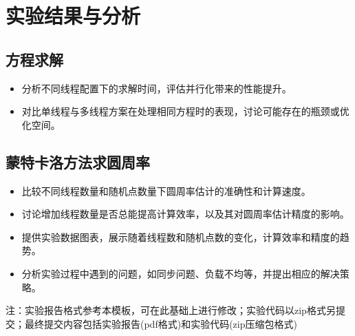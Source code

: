 \documentclass{SYSUReport}
\begin{document}
\section{实验结果与分析}
\subsection{方程求解}
\begin{itemize}
    \item 分析不同线程配置下的求解时间，评估并行化带来的性能提升。
    \item 对比单线程与多线程方案在处理相同方程时的表现，讨论可能存在的瓶颈或优化空间。
\end{itemize}
   
\subsection{蒙特卡洛方法求圆周率}
\begin{itemize}
\item 比较不同线程数量和随机点数量下圆周率估计的准确性和计算速度。
    \item 讨论增加线程数量是否总能提高计算效率，以及其对圆周率估计精度的影响。
    \item 提供实验数据图表，展示随着线程数和随机点数的变化，计算效率和精度的趋势。
    \item 分析实验过程中遇到的问题，如同步问题、负载不均等，并提出相应的解决策略。
\end{itemize}
注：实验报告格式参考本模板，可在此基础上进行修改；实验代码以zip格式另提交；最终提交内容包括实验报告(pdf格式)和实验代码(zip压缩包格式)
\end{document}
